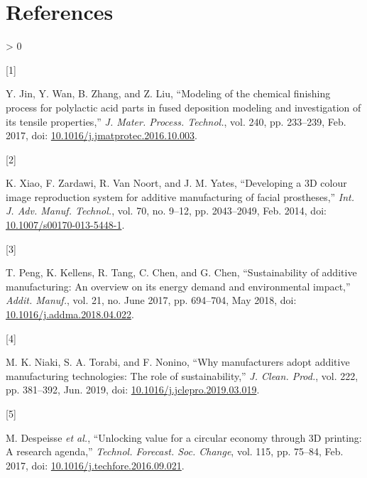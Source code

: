 \documentclass[conference,final,]{IEEEtran}
\newlength{\csllabelwidth}
\newlength{\cslhangindent}
\newenvironment{CSLReferences}[3] %
 {%
  \setlength{\parindent}{0pt}
  \ifodd #1 \everypar{\setlength{\hangindent}{\cslhangindent}}\ignorespaces\fi
  \ifnum #2 > 0
  \setlength{\parskip}{#2\baselineskip}
  \fi
 }%
 {}
\newcommand{\CSLLeftMargin}[1]{\parbox[t]{\csllabelwidth}{#1}}
\newcommand{\CSLRightInline}[1]{\parbox[t]{\linewidth - \csllabelwidth}{#1}}
\begin{document}
\newpage

\hypertarget{references}{%
\section*{References}\label{references}}

\hypertarget{refs}{}
\begin{CSLReferences}{0}{0}
\leavevmode\hypertarget{ref-Jin2017}{}%
\CSLLeftMargin{{[}1{]} }
\CSLRightInline{Y. Jin, Y. Wan, B. Zhang, and Z. Liu, {``{Modeling of
the chemical finishing process for polylactic acid parts in fused
deposition modeling and investigation of its tensile properties},''}
\emph{J. Mater. Process. Technol.}, vol. 240, pp. 233--239, Feb. 2017,
doi:
\href{https://doi.org/10.1016/j.jmatprotec.2016.10.003}{10.1016/j.jmatprotec.2016.10.003}.}

\leavevmode\hypertarget{ref-Xiao2014}{}%
\CSLLeftMargin{{[}2{]} }
\CSLRightInline{K. Xiao, F. Zardawi, R. Van Noort, and J. M. Yates,
{``{Developing a 3D colour image reproduction system for additive
manufacturing of facial prostheses},''} \emph{Int. J. Adv. Manuf.
Technol.}, vol. 70, no. 9--12, pp. 2043--2049, Feb. 2014, doi:
\href{https://doi.org/10.1007/s00170-013-5448-1}{10.1007/s00170-013-5448-1}.}

\leavevmode\hypertarget{ref-Peng2018}{}%
\CSLLeftMargin{{[}3{]} }
\CSLRightInline{T. Peng, K. Kellens, R. Tang, C. Chen, and G. Chen,
{``{Sustainability of additive manufacturing: An overview on its energy
demand and environmental impact},''} \emph{Addit. Manuf.}, vol. 21, no.
June 2017, pp. 694--704, May 2018, doi:
\href{https://doi.org/10.1016/j.addma.2018.04.022}{10.1016/j.addma.2018.04.022}.}

\leavevmode\hypertarget{ref-Niaki2019}{}%
\CSLLeftMargin{{[}4{]} }
\CSLRightInline{M. K. Niaki, S. A. Torabi, and F. Nonino, {``{Why
manufacturers adopt additive manufacturing technologies: The role of
sustainability},''} \emph{J. Clean. Prod.}, vol. 222, pp. 381--392, Jun.
2019, doi:
\href{https://doi.org/10.1016/j.jclepro.2019.03.019}{10.1016/j.jclepro.2019.03.019}.}

\leavevmode\hypertarget{ref-Despeisse2016}{}%
\CSLLeftMargin{{[}5{]} }
\CSLRightInline{M. Despeisse \emph{et al.}, {``{Unlocking value for a
circular economy through 3D printing: A research agenda},''}
\emph{Technol. Forecast. Soc. Change}, vol. 115, pp. 75--84, Feb. 2017,
doi:
\href{https://doi.org/10.1016/j.techfore.2016.09.021}{10.1016/j.techfore.2016.09.021}.}


\end{CSLReferences}
\end{document}
